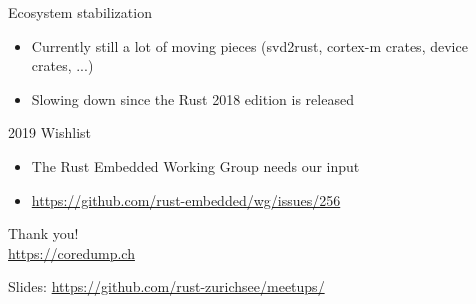 \documentclass[aspectratio=1610,14pt,t]{beamer}
\begin{document}
\begin{frame}[c]{Ecosystem stabilization}
  \begin{itemize}
    \item Currently still a lot of moving pieces (svd2rust, cortex-m crates,
      device crates, ...)
    \item Slowing down since the Rust 2018 edition is released
  \end{itemize}
\end{frame}

\begin{frame}[c]{2019 Wishlist}
  \begin{itemize}
    \item The Rust Embedded Working Group needs our input
    \item \url{https://github.com/rust-embedded/wg/issues/256}
  \end{itemize}
\end{frame}


{
\begin{frame}[standout]
  \begin{centering}
    {\Huge Thank you!}\\
    {\normalsize \url{https://coredump.ch}}\\
  \end{centering}
  {\small Slides: \url{https://github.com/rust-zurichsee/meetups/}}\\
  \vspace{3cm}
\end{frame}
}
\end{document}
